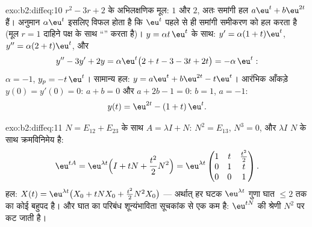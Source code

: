 \begin{solution}{exo:b2:diffeq:10}
$r^2 - 3r + 2$ के अभिलक्षणिक मूल: $1$ और $2$, अतः समांगी हल $a\eu^t + b\eu^{2t}$ हैं। अनुमान $\alpha\eu^t$ इसलिए
विफल होता है कि $\eu^t$ पहले से ही समांगी समीकरण को हल करता है (मूल $r = 1$ दाहिने
पक्ष के साथ ``'' करता है)। $y = \alpha t\,\eu^t$ के साथ: $y' = \alpha(1 +
t)\eu^t$, $y'' = \alpha(2 + t)\eu^t$, और
\[
y'' - 3y' + 2y = \alpha\eu^t\bigl(2 + t - 3 - 3t + 2t\bigr)
= -\alpha\,\eu^t :
\]
$\alpha = -1$, $y_p = -t\,\eu^t$। सामान्य हल: $y = a\eu^t
+ b\eu^{2t} - t\eu^t$। आरंभिक आँकड़े $y(0) = y'(0) = 0$: $a + b
= 0$ और $a + 2b - 1 = 0$: $b = 1$,
$a = -1$:
\[
y(t) = \eu^{2t} - (1 + t)\,\eu^{t} .
\]

\end{solution}

\begin{solution}{exo:b2:diffeq:11}
$N = E_{12} + E_{23}$ के साथ $A = \lambda I + N$: $N^2 = E_{13}$, $N^3 = 0$, और $\lambda I$ $N$ के साथ क्रमविनिमेय है:
\[
\eu^{tA} = \eu^{\lambda t}\Bigl(I + tN +
\frac{t^2}{2}N^2\Bigr)
= \eu^{\lambda t}\begin{pmatrix}
1 & t & \frac{t^2}{2}\\
0 & 1 & t\\
0 & 0 & 1
\end{pmatrix}.
\]
हल: $X(t) = \eu^{\lambda t}\bigl(X_0 + tNX_0 +
\frac{t^2}2N^2X_0\bigr)$ --- अर्थात् हर घटक $\eu^{\lambda
t}$ गुणा घात $\leq 2$ तक का कोई बहुपद है। और घात का
परिबंध शून्यंभाविता सूचकांक से एक कम है: $\eu^{tN}$ की श्रेणी $N^2$ पर कट जाती
है।
\end{solution}

